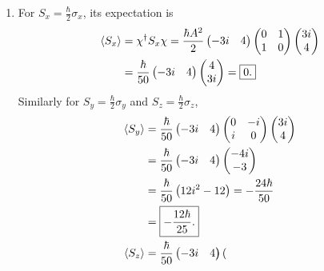 \documentclass{homework}
\begin{document}
\begin{enumerate}
\begin{enumerate}
				\item For $S_x = \frac{\hbar}{2} \sigma_x$, its expectation is \begin{align*}
					\expval{S_x} & = \chi^\dagger S_x \chi = \frac{\hbar A^2}{2} \begin{pmatrix}
						-3i & 4
					\end{pmatrix} \begin{pmatrix}
					0 & 1 \\
					1 & 0 
				\end{pmatrix} \begin{pmatrix}
				3i \\ 4
			\end{pmatrix}  \\
				& = \frac{\hbar}{50} 
					\begin{pmatrix}
						-3i & 4
					\end{pmatrix} \begin{pmatrix}
					4 \\ 3i
				\end{pmatrix} = \boxed{0.}
				\end{align*}
				Similarly for $S_y = \frac{\hbar}{2} \sigma_y$ and $S_z = \frac{\hbar}{2} \sigma_z$, 
				\begin{align*}
					\expval{S_y} & = \frac{\hbar}{50} \begin{pmatrix}
						-3i & 4
					\end{pmatrix} \begin{pmatrix}
					0 & -i \\
					i & 0
				\end{pmatrix} \begin{pmatrix}
					3i \\ 4
				\end{pmatrix} \\
				& = \frac{\hbar}{50} \begin{pmatrix}
					-3i & 4
				\end{pmatrix} \begin{pmatrix}
					-4i \\ -3
				\end{pmatrix} \\
				& = \frac{\hbar}{50} \left(12i^2 - 12\right) = -\frac{24\hbar}{50} \\
				& = \boxed{-\frac{12\hbar}{25}.}  \\
				\expval{S_z} & = \frac{\hbar}{50} \begin{pmatrix}
						-3i & 4
					\end{pmatrix}
					\begin{pmatrix}

\end{pmatrix}
\end{align*}
\end{enumerate}
\end{enumerate}
\end{document}
